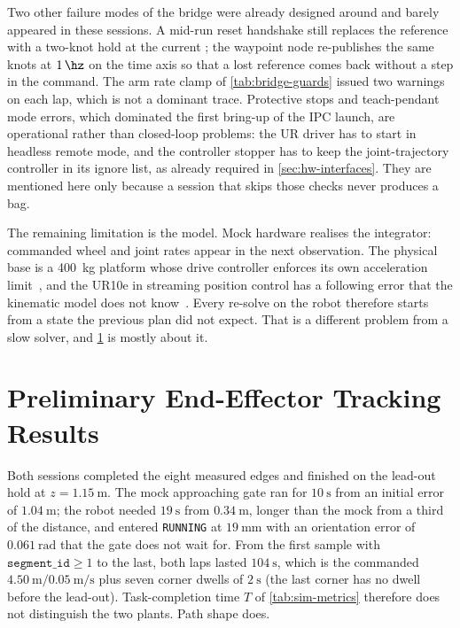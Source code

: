 Two other failure modes of the bridge were already designed around and
barely appeared in these sessions. A mid-run reset handshake still
replaces the reference with a two-knot hold at the current \ee{}; the
waypoint node re-publishes the same knots at $\qty{1}{\hz}$ on the
\ocs{} time axis so that a lost reference comes back without a step in
the command. The arm rate clamp of \cref{tab:bridge-guards} issued two
warnings on each lap, which is not a dominant trace. Protective stops
and teach-pendant mode errors, which dominated the first bring-up of the
IPC launch, are operational rather than closed-loop problems: the UR
driver has to start in headless remote mode, and the controller stopper
has to keep the joint-trajectory controller in its ignore list, as
already required in \cref{sec:hw-interfaces}. They are mentioned here
only because a session that skips those checks never produces a bag.

The remaining limitation is the model. Mock hardware realises the
integrator: commanded wheel and joint rates appear in the next
observation. The physical base is a \qty{400}{\kilo\gram} platform whose
drive controller enforces its own acceleration
limit~\cite{HenkelRoth2019freeMoVe}, and the UR10e in streaming position
control has a following error that the kinematic model does not
know~\cite{UR10e}. Every re-solve on the robot therefore starts from a
state the previous plan did not expect. That is a different problem from
a slow solver, and \cref{sec:hw-results} is mostly about it.

\section{Preliminary End-Effector Tracking Results}
\label{sec:hw-results}

Both sessions completed the eight measured edges and finished on the
lead-out hold at $z=\qty{1.15}{\meter}$. The mock approaching gate ran
for $\qty{10}{\second}$ from an initial \ee{} error of
$\qty{1.04}{\meter}$; the robot needed $\qty{19}{\second}$ from
$\qty{0.34}{\meter}$, longer than the mock from a third of the
distance, and entered \texttt{RUNNING} at
$\qty{19}{\milli\meter}$ with an orientation error of
$\qty{0.061}{\radian}$ that the gate does not wait for. From the first
sample with $\texttt{segment\_id}\ge 1$ to the last, both laps lasted
$\qty{104}{\second}$, which is the commanded
$\qty{4.50}{\meter}/\qty{0.05}{\meter\per\second}$ plus seven corner
dwells of $\qty{2}{\second}$ (the last corner has no dwell before the
lead-out). Task-completion time $T$ of \cref{tab:sim-metrics} therefore
does not distinguish the two plants. Path shape does.

